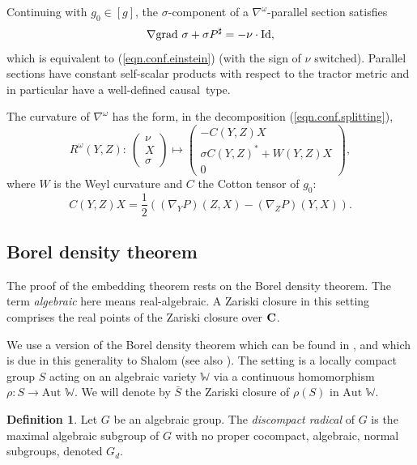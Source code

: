 \documentclass[pdftex]{sigma}
\numberwithin{equation}{section}
\theoremstyle{definition}
\newtheorem{defin}[thm]{Definition}
\begin{document}
Continuing with $g_0 \in [g]$, the $\sigma$-component of a $\nabla^\omega$-parallel section satisfies
\[ \nabla \mbox{grad } \sigma + \sigma P^\sharp = - \nu \cdot {\rm Id},\]
which is equivalent to (\ref{eqn.conf.einstein}) (with the sign of $\nu$ switched). Parallel sections have constant self-scalar products with respect to the tractor metric and in particular have a well-defined causal~type.

The curvature of $\nabla^\omega$ has the form, in the decomposition (\ref{eqn.conf.splitting}),
\begin{equation}
\label{eqn.conf.curv}
R^\omega(Y,Z) \colon\ \begin{pmatrix} \nu \\ X \\ \sigma \end{pmatrix} \mapsto \begin{pmatrix} - C(Y,Z)X \\ \sigma C(Y,Z)^* + W(Y,Z) X \\ 0 \end{pmatrix},
\end{equation}
where $W$ is the Weyl curvature and $C$ the Cotton tensor of $g_0$:
\[C(Y,Z)X = \frac{1}{2} \left( (\nabla_Y P)(Z,X) - (\nabla_Z P)(Y,X) \right).\]

\subsection{Borel density theorem}

The proof of the embedding theorem rests on the Borel density
theorem.
The term
\emph{algebraic} here means real-algebraic. A Zariski closure in this setting comprises the real points of the Zariski closure over ${\bf C}$.

 We use a version of the Borel density theorem which can be found in \cite[Corollary~3.2]{bfm.zimemb}, and which is due in this generality to Shalom
\cite[Theorem~3.11]{shalom.discompact} (see also \cite[Theorem~2.6]{dani.borel.density}).
The setting is a locally compact group $S$ acting on an algebraic variety $\mathbb{W}$ via a
continuous homomorphism $\rho \colon S \rightarrow \mbox{Aut } \mathbb{W}$. We
will denote by
$\bar{S}$ the Zariski closure of $\rho(S)$ in $\mbox{Aut }\mathbb{W}$.

\begin{defin}
 \label{def.discompact.rad}
 Let $G$ be an algebraic group.
The \emph{discompact radical} of $G$ is the maximal algebraic subgroup
of $G$ with no proper cocompact, algebraic, normal subgroups, denoted $G_d$.
 \end{defin}
\end{document}
